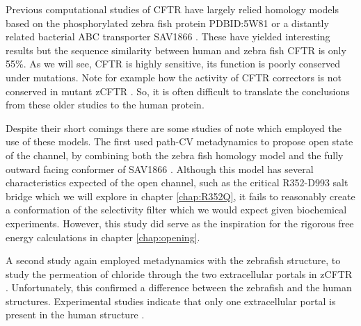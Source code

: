 \begin{enumerate}
\end{enumerate}



Previous computational studies of CFTR have largely relied homology models based on the phosphorylated zebra fish protein PDBID:5W81 \cite{zhang2017a} or a distantly related bacterial ABC transporter SAV1866 \cite{dawson2006, Hoffmann2018}. These have yielded interesting results but the sequence similarity between human and zebra fish CFTR is only 55\%. As we will see, CFTR is highly sensitive, its function is poorly conserved under mutations. Note for example how the activity of CFTR correctors is not conserved in mutant zCFTR \cite{laselva2019}. So, it is often difficult to translate the conclusions from these older studies to the human protein. 

Despite their short comings there are some studies of note which employed the use of these models. The first used path-CV metadynamics to propose open state of the channel, by combining both the zebra fish homology model and the fully outward facing conformer of SAV1866 \cite{Hoffmann2018}. Although this model has several characteristics expected of the open channel, such as the critical R352-D993 salt bridge which we will explore in chapter \ref{chap:R352Q}, it fails to reasonably create a conformation of the selectivity filter which we would expect given biochemical experiments. However,  this study did serve as the inspiration for the rigorous free energy calculations in chapter \ref{chap:opening}. 

A second study again employed metadynamics with the zebrafish structure, to study the permeation of chloride through the two extracellular portals in zCFTR \cite{farkas2020}. Unfortunately, this confirmed a difference between the zebrafish and the human structures. Experimental studies indicate that only one extracellular portal is present in the human structure \cite{linsdell2018}.

